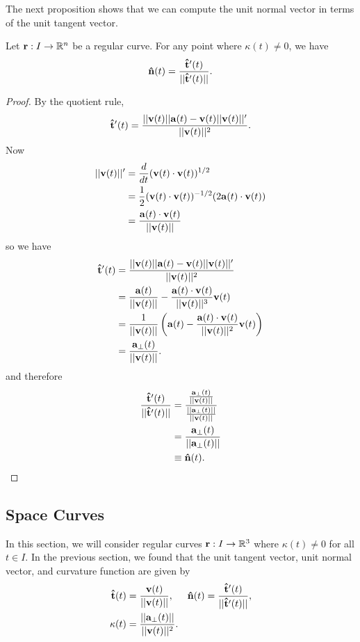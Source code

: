 \documentclass[12pt,letterpaper,reqno]{article}
\numberwithin{equation}{section}
\newcommand{\R}{\ensuremath{\mathbb R}}
\newcommand{\bv}{{\bf v}}
\newcommand{\ba}{{\bf a}}
\newcommand{\bbr}{{\bf r}}
\newcommand{\ut}{{\bf {\hat{t}}}}
\newcommand{\un}{{\bf {\hat{n}}}}
\newcommand{\fixme}[1]{{\color{orange}{[#1]}}}
\begin{document}
{The next proposition shows that we can compute the unit normal vector in terms of the unit tangent vector.

\begin{prop}
Let $\bbr:I \to \R^n$ be a regular curve. For any point where $\kappa(t) \neq 0$, we have
\begin{align*}
	\un(t)=\frac{\ut'(t)}{||\ut'(t)||}.
\end{align*}
\end{prop}

\begin{proof}
	By the quotient rule,
	\begin{align*}
		\ut'(t)=\frac{||\bv(t)||\ba(t)-\bv(t)||\bv(t)||'}{||\bv(t)||^2}.
	\end{align*}
	Now
	\begin{align*}
		||\bv(t)||'&=\frac{d}{dt}(\bv(t) \cdot \bv(t))^{1/2} \\
		&=\frac{1}{2}(\bv(t) \cdot \bv(t))^{-1/2}(2\ba(t) \cdot \bv(t)) \\
		&=\frac{\ba(t) \cdot \bv(t)}{||\bv(t)||} \\
	\end{align*}
	so we have
	\begin{align*}
		\ut'(t)&=\frac{||\bv(t)||\ba(t)-\bv(t)||\bv(t)||'}{||\bv(t)||^2} \\
		&=\frac{\ba(t)}{||\bv(t)||}-\frac{\ba(t) \cdot \bv(t)}{||\bv(t)||^3}\bv(t) \\
		&=\frac{1}{||\bv(t)||}\left(\ba(t)-\frac{\ba(t) \cdot \bv(t)}{||\bv(t)||^2}\bv(t)\right) \\
		&=\frac{\ba_\perp(t)}{||\bv(t)||}.
	\end{align*}
	and therefore
	\begin{align*}
		\frac{\ut'(t)}{||\ut'(t)||}&=\frac{\frac{\ba_\perp(t)}{||\bv(t)||}}{\frac{||\ba_\perp(t)||}{||\bv(t)||}} \\
		&=\frac{\ba_\perp(t)}{||\ba_\perp(t)||} \\
		&\equiv \un(t).
	\end{align*}
\end{proof}

\fixme{Assign exercises from the book.}

\subsection{Space Curves}
In this section, we will consider regular curves $\bbr:I \to \R^3$ where $\kappa(t) \neq 0$ for all $t \in I$. In the previous section, we found that the unit tangent vector, unit normal vector, and curvature function are given by
	\begin{align*}
		\ut(t)&=\frac{\bv(t)}{||\bv(t)||}, \hspace{0.5cm} \un(t)=\frac{\ut'(t)}{||\ut'(t)||}, \\
		\kappa(t)&=\frac{||\ba_\perp(t)||}{||\bv(t)||^2}.
	\end{align*} 

}
\end{document}

